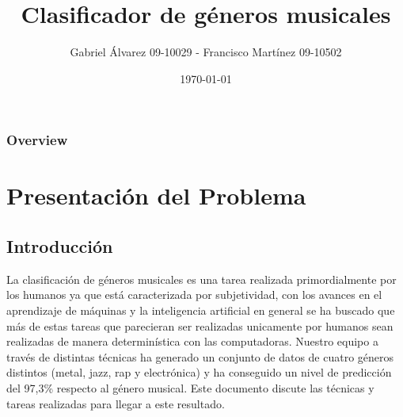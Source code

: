 \documentclass{beamer}
\title[Proyecto Final]{Clasificador de g\'{e}neros musicales} %
\author{Gabriel \'{A}lvarez 09-10029 - Francisco Mart\'{i}nez 09-10502} %
\institute[USB] %
{
Universidad Sim\'{o}n Bol\'{i}var \\ %
\medskip
\textit{gabrielaar11@gmail.com - frammnm@gmail.com} %
}
\date{\today} %
\begin{document}
    

\begin{frame}
\titlepage %
\end{frame}

\begin{frame}
\frametitle{Overview} %
\tableofcontents %
\end{frame}


\section{Presentaci\'{o}n del Problema} %
\subsection{Introducci\'{o}n}
\begin{frame}
La clasificaci\'{o}n de g\'{e}neros musicales es una tarea realizada primordialmente por los humanos ya que est\'{a} caracterizada por subjetividad, con los avances en el aprendizaje de m\'{a}quinas y la inteligencia artificial en general se ha buscado que m\'{a}s de estas tareas que parecieran ser realizadas unicamente por humanos sean realizadas de manera determin\'{i}stica con las computadoras. Nuestro equipo a trav\'{e}s de distintas t\'{e}cnicas ha generado un conjunto de datos de cuatro g\'{e}neros distintos (metal, jazz, rap y electr\'{o}nica) y ha conseguido un nivel de predicci\'{o}n del 97,3\% respecto al g\'{e}nero musical. Este documento discute las t\'{e}cnicas y tareas realizadas para llegar a este resultado.
\end{frame}
\end{document}
